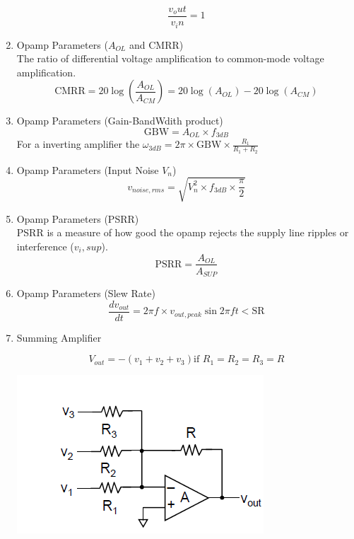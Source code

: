 \documentclass{article}
\begin{document}
\begin{enumerate}
    \begin{equation}
        \frac{v_out}{v_in} = 1
    \end{equation}
    \item Opamp Parameters ($A_{OL}$ and CMRR) \\
    The ratio of differential voltage amplification to common-mode voltage amplification.
    \begin{equation}
        \text{CMRR} = 20\log(\frac{A_{OL}}{A_{CM}}) = 20\log(A_{OL})-20\log(A_{CM})
    \end{equation}
    \item Opamp Parameters (Gain-BandWdith product) 
    \begin{equation}
        \text{GBW} = A_{OL} \times f_{3dB}
    \end{equation}
    For a inverting amplifier the $\omega_{3dB} = 2\pi \times \text{GBW} \times \frac{R_1}{R_1+R_2}$
    \item Opamp Parameters (Input Noise $V_n$) 
    \begin{equation}
        v_{noise,rms} = \sqrt{V_n^2\times f_{3dB}\times\frac{\pi}{2}}
    \end{equation}
    \item Opamp Parameters (PSRR) \\
    PSRR is a measure of how good the opamp rejects the supply line ripples or interference ($v_i,sup$).
    \begin{equation}
        \text{PSRR} = \frac{A_{OL}}{A_{SUP}}
    \end{equation}
    \item Opamp Parameters (Slew Rate) 
    \begin{equation}
        \frac{dv_{out}}{dt} = 2\pi f \times v_{out,peak}\sin{2\pi ft} < \text{SR}
    \end{equation}
    \item Summing Amplifier \\
    \begin{minipage}{0.5\textwidth}
        \begin{equation}
        V_{out} = -(v_1+v_2+v_3) \text{if $R_1=R_2=R_3=R$}
    \end{equation}
    \end{minipage}
    \begin{minipage}{0.5\textwidth}
        \includegraphics[width=0.75\linewidth]{image/summingamp.png}

\end{minipage}
\end{enumerate}
\end{document}
